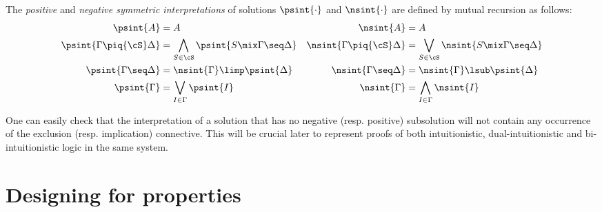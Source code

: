 \begin{definition}
  The \emph{positive} and \emph{negative symmetric interpretations} of solutions
  $\psint{\cdot}$ and $\nsint{\cdot}$ are defined by mutual recursion as
  follows:
  \begin{align*}
    \psint{A} &= A &
    \nsint{A} &= A \\
    \psint{\Gamma \piq{\cS} \Delta} &=
      \bigwedge_{S \in \cS} \psint{S \mix \Gamma \seq \Delta} &
    \nsint{\Gamma \piq{\cS} \Delta} &=
      \bigvee_{S \in \cS} \nsint{S \mix \Gamma \seq \Delta} \\
    \psint{\Gamma \seq \Delta} &=
      \nsint{\Gamma} \limp \psint{\Delta} &
    \nsint{\Gamma \seq \Delta} &=
      \nsint{\Gamma} \lsub \psint{\Delta} \\
    \psint{\Gamma} &= \bigvee_{I \in \Gamma}{\psint{I}} &
    \nsint{\Gamma} &= \bigwedge_{I \in \Gamma}{\nsint{I}}
  \end{align*}
\end{definition}

One can easily check that the interpretation of a solution that has no negative
(resp. positive) subsolution will not contain any occurrence of the exclusion
(resp. implication) connective. This will be crucial later to represent proofs
of both intuitionistic, dual-intuitionistic and bi-intuitionistic logic in the
same system.

\section{Designing for properties}


